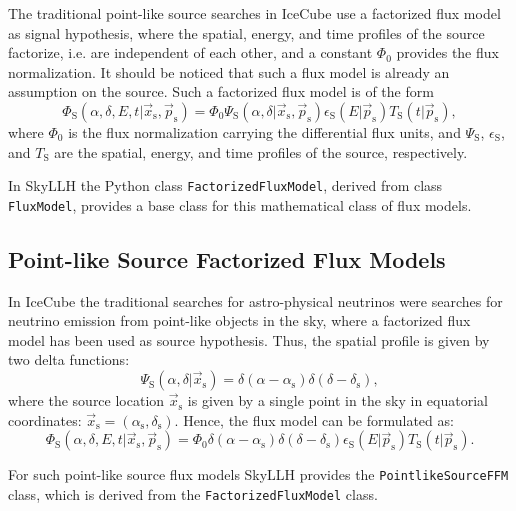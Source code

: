 \documentclass{article}
\newcommand{\code}[1]{\texttt{#1}}
\newcommand{\class}[1]{\colorbox{blue!30}{\code{#1}}}
\newcommand{\ps}{\vec{p}_{\mathrm{s}}}
\newcommand{\xs}{\vec{x}_{\mathrm{s}}}
\begin{document}
The traditional point-like source searches in IceCube use a factorized flux
model as signal hypothesis, where the spatial, energy, and time profiles of the
source factorize, i.e. are independent of each other, and a constant $\Phi_0$
provides the flux normalization. It should be noticed that such a
flux model is already an assumption on the source. Such a factorized flux model
is of the form
\begin{equation}
 \Phi_{\mathrm{S}}(\alpha,\delta,E,t|\xs,\ps) = \Phi_0 \Psi_{\mathrm{S}}(\alpha,\delta|\xs,\ps) \epsilon_{\mathrm{S}}(E|\ps) T_{\mathrm{S}}(t|\ps),
\end{equation}
where $\Phi_0$ is the flux normalization carrying the differential flux units,
and $\Psi_{\mathrm{S}}$, $\epsilon_{\mathrm{S}}$, and $T_{\mathrm{S}}$ are the
spatial, energy, and time profiles of the source, respectively.

In SkyLLH the Python class \class{FactorizedFluxModel}, derived from class
\class{FluxModel}, provides a base class for this mathematical class of flux models.

\subsection{Point-like Source Factorized Flux Models}
\label{sec:point-like-source-factorized-flux-models}

In IceCube the traditional searches for astro-physical neutrinos were searches
for neutrino emission from point-like objects in the sky, where a factorized
flux model has been used as source hypothesis. Thus, the spatial profile is
given by two delta functions:
\begin{equation}
 \Psi_{\mathrm{S}}(\alpha,\delta|\xs) = \delta(\alpha-\alpha_{\mathrm{s}})\delta(\delta-\delta_{\mathrm{s}}),
\end{equation}
where the source location $\xs$ is given by a single point in the sky in
equatorial coordinates: $\xs = (\alpha_{\mathrm{s}}, \delta_{\mathrm{s}})$.
Hence, the flux model can be formulated as:
\begin{equation}
 \Phi_{\mathrm{S}}(\alpha,\delta,E,t|\xs,\ps) = \Phi_0 \delta(\alpha-\alpha_{\mathrm{s}})\delta(\delta-\delta_{\mathrm{s}}) \epsilon_{\mathrm{S}}(E|\ps) T_{\mathrm{S}}(t|\ps).
\end{equation}

For such point-like source flux models SkyLLH provides the
\class{PointlikeSourceFFM} class, which is derived from the \class{FactorizedFluxModel}
class.
\end{document}
